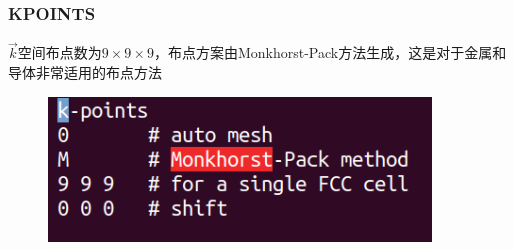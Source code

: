 \frame
{
	\frametitle{\textrm{KPOINTS}}
$\vec k$空间布点数为$9\times9\times9$，布点方案由\textrm{Monkhorst-Pack}方法生成，这是对于金属和导体非常适用的布点方法%
\begin{figure}[h!]
\centering
\includegraphics[width=4.0in,viewport=0 0 330 118,clip]{Figures/Pt_FCC-KPOINTS.png}
\caption{\fontsize{6.2pt}{5.2pt}}%
\label{Pt_FCC:KPOINTS}
\end{figure}
}
